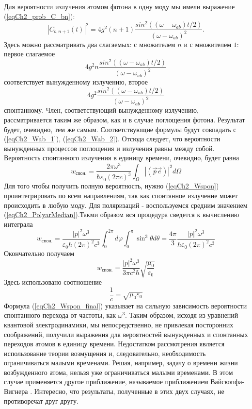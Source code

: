 Для вероятности излучения атомом фотона в одну моду мы имели выражение
(\ref{eqCh2_prob_C_bn}):
\[
\left|C_{b, n + 1}\left(t\right)\right|^2 = 4 g^2 \left(n + 1\right)
\frac{sin^2\left(\left(\omega - \omega_{ab}\right)t/2\right)}
{\left(\omega - \omega_{ab}\right)^2}.
\]
Здесь можно рассматривать два слагаемых: с
множителем $n$ и с 
множителем $1$: первое слагаемое
\[
4 g^2 n
\frac{sin^2\left(\left(\omega - \omega_{ab}\right)t/2\right)}
{\left(\omega - \omega_{ab}\right)^2}
\]
соответствует вынужденному излучению, 
второе 
\[
4 g^2 
\frac{sin^2\left(\left(\omega - \omega_{ab}\right)t/2\right)}
{\left(\omega - \omega_{ab}\right)^2}
\]
спонтанному. Член, соответствующий вынужденному
излучению, рассматривается таким же образом, как и в случае поглощения
фотона. Результат будет, очевидно, тем же самым. Соответствующие
формулы будут совпадать с (\ref{eqCh2_Wab_1}), 
(\ref{eqCh2_Wab_2}). Отсюда следует, что вероятности
вынужденных процессов поглощения и излучения равны между
собой. Вероятность спонтанного излучения в единицу времени, очевидно, 
будет равна 
\begin{equation}
w_{\mbox{спон.}} = 
\frac{2 \pi \omega^3}
{\hbar \varepsilon_0 \left(2 \pi c\right)^3}
\int_{\Omega}
\left|\left(\vec{p} \vec{e}\right)\right|^2
d \Omega
\label{eqCh2_Wspon}
\end{equation}
Для того чтобы получить полную вероятность, нужно (\ref{eqCh2_Wspon})
проинтегрировать по всем направлениям, так как спонтанное излучение
может происходить в любую моду. Для поляризаций - воспользуемся
средним значением (\ref{eqCh2_PolyarMedian}).Такми образом вся
процедура сведется к вычислению интеграла 
\begin{equation}
w_{\mbox{спон.}} = 
\frac{\left|p\right|^2 \omega^3}
{\varepsilon_0 \hbar \left(2 \pi\right)^2 c^3}
\int_{0}^{2 \pi}d \varphi \int_0^{\pi}
\sin^3 \theta d \theta
= 
\frac{4 \pi}{3}\frac{\left|p\right|^2 \omega^3}
{\hbar \varepsilon_0 \left(2 \pi\right)^2 c^3}
\end{equation}
Окончательно получаем
\begin{equation}
w_{\mbox{спон.}} = 
\frac{\left|p\right|^2 \omega^3}
{3 \pi c^2 \hbar}
\sqrt{\frac{\mu_0}{\varepsilon_0}}
\label{eqCh2_Wspon_final}
\end{equation}
Здесь использовано соотношение  
\[
\frac{1}{c} = \sqrt{\mu_0 \varepsilon_0}
\]
Формула (\ref{eqCh2_Wspon_final}) указывает на сильную
зависимость вероятности спонтанного перехода от частоты, как  
$\omega^3$.  Таким
образом, исходя из уравнений квантовой электродинамики, мы
непосредственно, не привлекая посторонних соображений, получили
выражения для вероятностей вынужденных и спонтанных переходов атомов в
единицу времени. Недостатком рассмотрения является использование
теории возмущения и, следовательно, необходимость ограничиваться
малыми временами. Решая, например, задачу о времени жизни
возбужденного атома, нельзя уже ограничиваться малыми временами. В
этом случае применяется другое приближение, называемое приближением
Вайскопфа-Вигнера \cite{bLuisell1972}. Интересно, что результаты,
полученные в этих двух случаях, не противоречат друг другу.  

